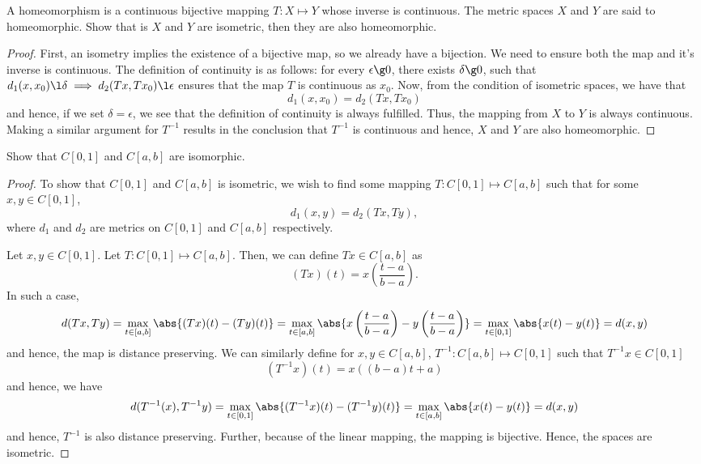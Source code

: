 \begin{question}
    A homeomorphism is a continuous bijective mapping $T : X \mapsto Y$ whose inverse is continuous. The metric spaces $X$ and $Y$ are said to homeomorphic. Show that is $X$ and $Y$ are isometric, then they are also homeomorphic.
\label{section1.6-5}
\end{question}
\begin{proof}
    First, an isometry implies the existence of a bijective map, so we already have a bijection. We need to ensure both the map and it's inverse is continuous. The definition of continuity is as follows: for every $\epsilon \g 0$, there exists $\delta \g 0$, such that $d_1(x , x_0) \l \delta \implies d_2(Tx , Tx_0) \l \epsilon$ ensures that the map $T$ is continuous as $x_0$. Now, from the condition of isometric spaces, we have that
    \[d_1(x , x_0) = d_2(Tx ,Tx_0)\]
    and hence, if we set $\delta = \epsilon$, we see that the definition of continuity is always fulfilled. Thus, the mapping from $X$ to $Y$ is always continuous. Making a similar argument for $T^{-1}$ results in the conclusion that $T^{-1}$ is continuous and hence, $X$ and $Y$ are also homeomorphic.
\end{proof}

\begin{question}
    Show that $C[0,1]$ and $C[a,b]$ are isomorphic.
    \label{section1.6-6}
\end{question}
\begin{proof}
    To show that $C[0,1]$ and $C[a,b]$ is isometric, we wish to find some mapping $T : C[0,1] \mapsto C[a,b]$ such that for some $x , y \in C[0,1]$, 
    \[d_1(x,y) = d_2(Tx , Ty),\]
    where $d_1$ and $d_2$ are metrics on $C[0,1]$ and $C[a,b]$ respectively.
    
    Let $x , y \in C[0,1]$. Let $T : C[0,1] \mapsto C[a,b]$. Then, we can define $Tx \in C[a,b]$ as
    \[(Tx) (t) = x\left( \frac{t-a}{b-a}\right).\]
    In such a case,
    \[d(Tx , Ty)  = \max_{t \in [a,b]} \abs{(Tx)(t) - (Ty)(t)} = \max_{t \in [a,b]} \abs{x\left( \frac{t-a}{b-a}\right) - y\left( \frac{t-a}{b-a}\right)} = \max_{t \in [0,1]} \abs{x(t) - y(t)} = d(x,y)\]
    and hence, the map is distance preserving. We can similarly define for $x , y \in C[a,b]$, $T^{-1} : C[a,b] \mapsto C[0,1]$ such that $T^{-1}x \in C[0,1]$
    \[(T^{-1}x)(t) = x((b-a)t + a)\]
     and hence, we have
     \[d(T^{-1}(x) , T^{-1}y) = \max_{t \in [0,1]} \abs{(T^{-1}x)(t) - (T^{-1}y)(t)}  = \max_{t \in [a,b]} \abs{x(t) - y(t)} = d(x,y)\]
      and hence, $T^{-1}$ is also distance preserving. Further, because of the linear mapping, the mapping is bijective. Hence, the spaces are isometric.
\end{proof}

